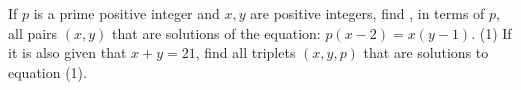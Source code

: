 If $p$ is a prime positive integer and  $x,y$ are positive integers,
find , in terms of $p$, all pairs $(x,y)$ that are solutions of the equation: $p(x-2)=x(y-1)$. (1)
If it is also given that $x+y=21$, find all triplets  $(x,y,p)$ that are solutions to equation (1).